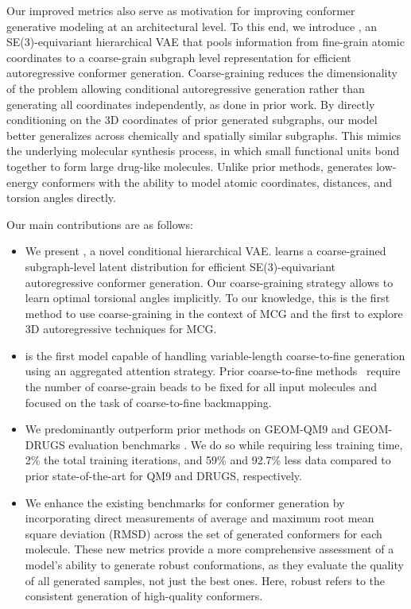 Our improved metrics also serve as motivation for improving conformer generative modeling at an architectural level.
To this end, we introduce \modelns, an SE(3)-equivariant hierarchical VAE that pools information from fine-grain atomic coordinates to a coarse-grain subgraph level representation for efficient autoregressive conformer generation. 
Coarse-graining reduces the dimensionality of the problem allowing conditional autoregressive generation rather than generating all coordinates independently, as done in prior work.
By directly conditioning on the 3D coordinates of prior generated subgraphs, our model better generalizes across chemically and spatially similar subgraphs. 
This mimics the underlying molecular synthesis process, in which small functional units bond together to form large drug-like molecules. Unlike prior methods, \model generates low-energy conformers with the ability to model atomic coordinates, distances, and torsion angles directly. 

Our main contributions are as follows:

\begin{itemize}
 
\item We present \modelns, a novel conditional hierarchical VAE. \model learns a coarse-grained subgraph-level latent distribution for efficient SE(3)-equivariant autoregressive conformer generation.
Our coarse-graining strategy allows \model to learn optimal torsional angles implicitly.
To our knowledge, this is the first method to use coarse-graining in the context of MCG and the first to explore 3D autoregressive techniques for MCG.

\item \model is the first model capable of handling variable-length coarse-to-fine generation using an aggregated attention strategy. Prior coarse-to-fine methods~\citep{CGVAE} require the number of coarse-grain beads to be fixed for all input molecules and focused on the task of coarse-to-fine backmapping.

\item We predominantly outperform prior methods on GEOM-QM9 and GEOM-DRUGS evaluation benchmarks \citep{GEOM}. We do so while requiring less training time, 2\% the total training iterations, and 59\% and 92.7\% less data compared to prior state-of-the-art for QM9 and DRUGS, respectively.

\item We enhance the existing benchmarks for conformer generation by incorporating direct measurements of average and maximum root mean square deviation (RMSD) across the set of generated conformers for each molecule. These new metrics provide a more comprehensive assessment of a model's ability to generate robust conformations, as they evaluate the quality of all generated samples, not just the best ones.
Here, robust refers to the consistent generation of high-quality conformers.
\end{itemize}